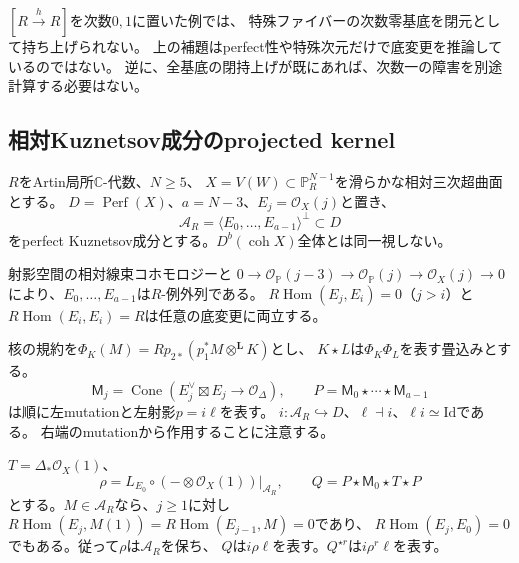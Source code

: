 \begin{remark}
$[R\xrightarrow{h}R]$を次数$0,1$に置いた例では、
特殊ファイバーの次数零基底を閉元として持ち上げられない。
上の補題はperfect性や特殊次元だけで底変更を推論しているのではない。
逆に、全基底の閉持上げが既にあれば、次数一の障害を別途計算する必要はない。
\end{remark}

\subsection{相対Kuznetsov成分のprojected kernel}

$R$をArtin局所$\mathbb C$-代数、$N\ge5$、
$X=V(W)\subset\mathbb P_R^{N-1}$を滑らかな相対三次超曲面とする。
$D=\operatorname{Perf}(X)$、$a=N-3$、$E_j=\mathcal O_X(j)$と置き、
\[
 \mathcal A_R=\langle E_0,\ldots,E_{a-1}\rangle^\perp\subset D
\]
をperfect Kuznetsov成分とする。$D^b(\operatorname{coh}X)$全体とは同一視しない。

射影空間の相対線束コホモロジーと
$0\to\mathcal O_{\mathbb P}(j-3)\to\mathcal O_{\mathbb P}(j)\to\mathcal O_X(j)\to0$
により、$E_0,\ldots,E_{a-1}$は$R$-例外列である。
$R\operatorname{Hom}(E_j,E_i)=0$（$j>i$）と
$R\operatorname{Hom}(E_i,E_i)=R$は任意の底変更に両立する。

核の規約を$\Phi_K(M)=Rp_{2*}(p_1^*M\otimes^{\mathbf L}K)$とし、
$K\star L$は$\Phi_K\Phi_L$を表す畳込みとする。
\[
 \mathsf M_j=\operatorname{Cone}(E_j^\vee\boxtimes E_j\longrightarrow\mathcal O_\Delta),
 \qquad P=\mathsf M_0\star\cdots\star\mathsf M_{a-1}
 \tag{GR2}\label{gr:eq:projector}
\]
は順に左mutationと左射影$p=i\ell$を表す。
$i:\mathcal A_R\hookrightarrow D$、$\ell\dashv i$、$\ell i\simeq\mathrm{Id}$である。
右端のmutationから作用することに注意する。

$T=\Delta_*\mathcal O_X(1)$、
\[
 \rho=L_{E_0}\circ(-\otimes\mathcal O_X(1))|_{\mathcal A_R},
 \qquad Q=P\star\mathsf M_0\star T\star P
 \tag{GR3}\label{gr:eq:rotation-kernel}
\]
とする。$M\in\mathcal A_R$なら、$j\ge1$に対し
$R\operatorname{Hom}(E_j,M(1))=R\operatorname{Hom}(E_{j-1},M)=0$であり、
$R\operatorname{Hom}(E_j,E_0)=0$でもある。従って$\rho$は$\mathcal A_R$を保ち、
$Q$は$i\rho\ell$を表す。$Q^{\star r}$は$i\rho^r\ell$を表す。


